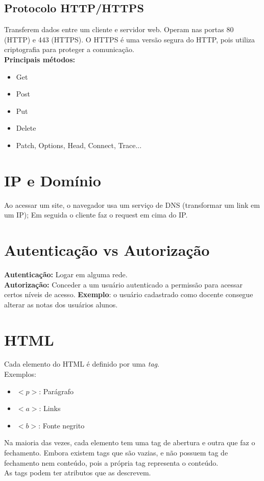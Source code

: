 \documentclass[ ]{article}
\begin{document}
		\subsection{Protocolo HTTP/HTTPS}
			Transferem dados entre um cliente e servidor web.  Operam nas portas 80 (HTTP) e 443 (HTTPS). O HTTPS é uma versão segura do HTTP, pois utiliza criptografia para proteger a comunicação.\\
			\textbf{Principais métodos:}
			\begin{itemize}
				\item Get
				\item Post
				\item Put
				\item Delete
				\item Patch, Options, Head, Connect, Trace...
			\end{itemize}
	\section{IP e Domínio}
		Ao acessar um site, o navegador usa um serviço de DNS (transformar um link em um IP); Em seguida o cliente faz o request em cima do IP.
	\section{Autenticação vs Autorização}
		\textbf{Autenticação:} Logar em alguma rede.\\
		\textbf{Autorização:} Conceder a um usuário autenticado a permissão para acessar certos níveis de acesso. \textbf{Exemplo}: o usuário cadastrado como docente consegue alterar as notas dos usuários alunos.
	\section{HTML}
		Cada elemento do HTML é definido por uma \textit{tag}.\\
		Exemplos:
		\begin{itemize}
			\item $<p> $: Parágrafo
			\item $<a>$: Links
			\item $<b>$: Fonte negrito
		\end{itemize}
		Na maioria das vezes, cada elemento tem uma tag de abertura e outra que faz o fechamento. Embora existem tags que são vazias, e não possuem tag de fechamento nem conteúdo, pois a própria tag representa o conteúdo.\\
		As tags podem ter atributos que as descrevem.
\end{document}
